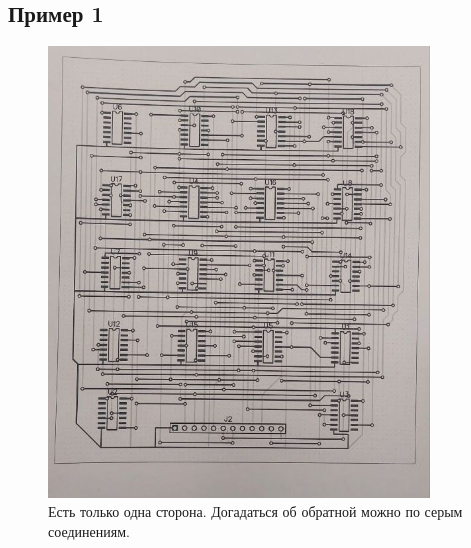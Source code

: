 \documentclass[a4paper, 12pt]{article}
\begin{document}
\subsection{Пример 1}
\begin{figure}[h!]
	\centering
	\includegraphics[width=0.9\textwidth]{docs/ex1.png}
	\caption{Есть только одна сторона. Догадаться об обратной можно по серым соединениям.}
\end{figure}

\newpage
\end{document}

